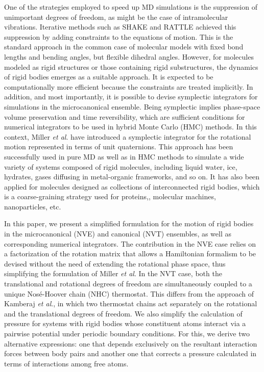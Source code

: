 \documentclass[aip,jcp,reprint,amsmath,amssymb,raggedbottom]{revtex4-1}
\begin{document}
One of the strategies employed to speed up MD simulations is the suppression of unimportant degrees of freedom, as might be the case of intramolecular vibrations. Iterative methods such as SHAKE\cite{Ryckaert1977} and RATTLE\cite{Andersen1983} achieved this suppression by adding constraints to the equations of motion. This is the standard approach in the common case of molecular models with fixed bond lengths and bending angles, but flexible dihedral angles. However, for molecules modeled as rigid structures or those containing rigid substructures,\cite{Miller2002} the dynamics of rigid bodies emerges as a suitable approach. It is expected to be computationally more efficient because the constraints are treated implicitly. In addition, and most importantly, it is possible to devise symplectic integrators for simulations in the microcanonical ensemble. Being symplectic implies phase-space volume preservation and time reversibility, which are sufficient conditions for numerical integrators to be used in hybrid Monte Carlo (HMC) methods.\cite{Duane1987} In this context, Miller \textit{et al}.\cite{Miller2002} have introduced a symplectic integrator for the rotational motion represented in terms of unit quaternions. This approach has been successfully used in pure MD as well as in HMC methods to simulate a wide variety of systems composed of rigid molecules, including liquid water,\cite{Sakamaki2011, Reinhardt2012, Palmer2014, Gonzales2014} ice,\cite{Geiger2014} hydrates,\cite{Tribello2009, Gorman2012} gases diffusing in metal-organic frameworks,\cite{Ghoufi2010} and so on. It has also been applied for molecules designed as collections of interconnected rigid bodies, which is a coarse-graining strategy used for proteins,\cite{Terada2003}, molecular machines,\cite{Akimov2008, Konyukhov2010} nanoparticles,\cite{Knorowski2012, Patra2013} etc.

In this paper, we present a simplified formulation for the motion of rigid bodies in the microcanonical (NVE) and canonical (NVT) ensembles, as well as corresponding numerical integrators. The contribution in the NVE case relies on a factorization of the rotation matrix that allows a Hamiltonian formalism to be devised without the need of extending the rotational phase space, thus simplifying the formulation of Miller \textit{et al}.\cite{Miller2002} In the NVT case, both the translational and rotational degrees of freedom are simultaneously coupled to a unique Nos\'{e}-Hoover chain (NHC) thermostat. This differs from the approach of Kamberaj \textit{et al}.,\cite{Kamberaj2005} in which two thermostat chains act separately on the rotational and the translational degrees of freedom. We also simplify the calculation of pressure for systems with rigid bodies whose constituent atoms interact via a pairwise potential under periodic boundary conditions. For this, we derive two alternative expressions: one that depends exclusively on the resultant interaction forces between body pairs and another one that corrects a pressure calculated in terms of interactions among free atoms.
\end{document}
